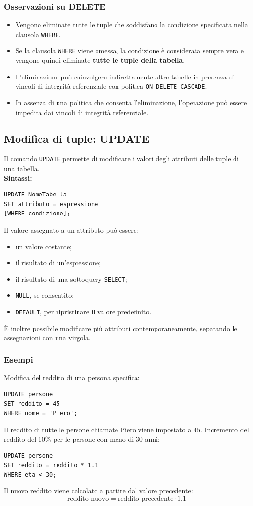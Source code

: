 \subsubsection*{Osservazioni su DELETE}
\begin{itemize}
    \item Vengono eliminate tutte le tuple che soddisfano la condizione specificata nella clausola \texttt{WHERE}.

    \item Se la clausola \texttt{WHERE} viene omessa, la condizione è considerata sempre vera e vengono quindi eliminate \textbf{tutte le tuple della tabella}.

    \item L'eliminazione può coinvolgere indirettamente altre tabelle in presenza di vincoli di integrità referenziale con politica \texttt{ON DELETE CASCADE}.

    \item In assenza di una politica che consenta l'eliminazione, l'operazione può essere impedita dai vincoli di integrità referenziale.
\end{itemize}
\subsection{Modifica di tuple: UPDATE}
Il comando \texttt{UPDATE} permette di modificare i valori degli attributi delle tuple di una tabella.\\
\textbf{Sintassi:}
\begin{verbatim}
UPDATE NomeTabella
SET attributo = espressione
[WHERE condizione];
\end{verbatim}
\noindent Il valore assegnato a un attributo può essere:
\begin{itemize}
    \item un valore costante;
    \item il risultato di un'espressione;
    \item il risultato di una sottoquery \texttt{SELECT};
    \item \texttt{NULL}, se consentito;
    \item \texttt{DEFAULT}, per ripristinare il valore predefinito.
\end{itemize}
È inoltre possibile modificare più attributi contemporaneamente, separando le assegnazioni con una virgola.
\subsubsection*{Esempi}
Modifica del reddito di una persona specifica:
\begin{verbatim}
UPDATE persone
SET reddito = 45
WHERE nome = 'Piero';
\end{verbatim}
Il reddito di tutte le persone chiamate Piero viene impostato a 45.
Incremento del reddito del 10\% per le persone con meno di 30 anni:
\begin{verbatim}
UPDATE persone
SET reddito = reddito * 1.1
WHERE eta < 30;
\end{verbatim}
Il nuovo reddito viene calcolato a partire dal valore precedente:
\[
\text{reddito nuovo} = \text{reddito precedente} \cdot 1.1
\]
